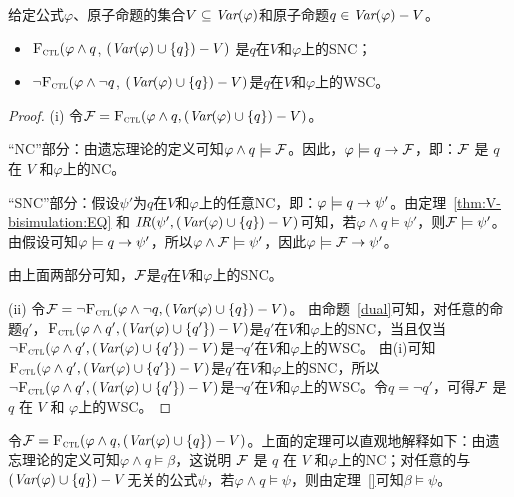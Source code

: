 \begin{theorem}\label{thm:SNC:WSC:forget}
	给定公式$\varphi$、原子命题的集合$V\subseteq\textit{Var}(\varphi)$和原子命题$q\in\textit{Var}(\varphi)- V$。
	\begin{itemize}
		\item[(i)] ${\textsc{F}_{\textsc{ctl}}} (\varphi \land q$, $(\textit{Var}(\varphi) \cup \{q\}) - V)$ 是$q$在$V$和$\varphi$上的SNC；
		\item[(ii)]  $\neg{\textsc{F}_{\textsc{ctl}}} (\varphi \land \neg q$, $(\textit{Var}(\varphi) \cup \{q\}) - V)$是$q$在$V$和$\varphi$上的WSC。
	\end{itemize}
\end{theorem}
\begin{proof}
	(i) 令${\cal F}={\textsc{F}_{\textsc{ctl}}}(\varphi \wedge q, (\textit{Var}(\varphi) \cup \{q\})- V)$。
	
	
	“NC”部分：由遗忘理论的定义可知$\varphi \wedge q \models {\cal F}$。因此，$\varphi\models q \rightarrow {\cal F}$，即：${\cal F}$ 是 $q$ 在 $V$ 和$\varphi$上的NC。
	
	“SNC”部分：假设$\psi'$为$q$在$V$和$\varphi$上的任意NC，即：$\varphi\models q \rightarrow \psi'$。由定理~\ref{thm:V-bisimulation:EQ} 和 $\emph{IR}(\psi', (\textit{Var}(\varphi) \cup \{q\})- V)$可知，若$\varphi \wedge q \models \psi'$，则${\cal F} \models \psi'$。
	由假设可知$\varphi\models q \rightarrow \psi'$，所以$\varphi \wedge {\cal F} \models \psi'$，因此$\varphi \models {\cal F} \rightarrow \psi'$。
	
	由上面两部分可知，${\cal F}$是$q$在$V$和$\varphi$上的SNC。
	
	(ii) 令${\cal F}=\neg {\textsc{F}_{\textsc{ctl}}}(\varphi \wedge \neg q, (\textit{Var}(\varphi) \cup \{q\})- V)$。
	由命题~\ref{dual}可知，对任意的命题$q'$，${\textsc{F}_{\textsc{ctl}}}(\varphi \wedge q', (\textit{Var}(\varphi) \cup \{q'\})- V)$是$q'$在$V$和$\varphi$上的SNC，当且仅当
	$\neg {\textsc{F}_{\textsc{ctl}}}(\varphi \wedge q', (\textit{Var}(\varphi) \cup \{q'\})- V)$是$\neg q'$在$V$和$\varphi$上的WSC。
	由(i)可知${\textsc{F}_{\textsc{ctl}}}(\varphi \wedge q', (\textit{Var}(\varphi) \cup \{q'\})- V)$是$q'$在$V$和$\varphi$上的SNC，所以$\neg {\textsc{F}_{\textsc{ctl}}}(\varphi \wedge q', (\textit{Var}(\varphi) \cup \{q'\})- V)$是$\neg q'$在$V$和$\varphi$上的WSC。令$q=\neg q'$，可得${\cal F}$ 是 $q$ 在 $V$ 和 $\varphi$上的WSC。
\end{proof}

令${\cal F}={\textsc{F}_{\textsc{ctl}}}(\varphi \wedge q, (\textit{Var}(\varphi) \cup \{q\})- V)$。上面的定理可以直观地解释如下：由遗忘理论的定义可知$\varphi \wedge q \models \beta$，这说明
${\cal F}$ 是 $q$ 在 $V$ 和$\varphi$上的NC；对任意的与$(\textit{Var}(\varphi) \cup \{q\})- V$无关的公式$\psi$，若$\varphi \wedge q \models \psi$，则由定理~\ref{}可知$\beta \models \psi$。

